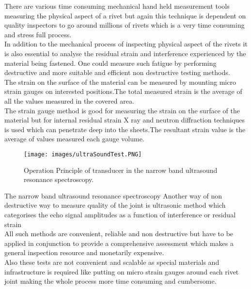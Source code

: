 \documentclass{article}
\begin{document}
    There are various time consuming mechanical hand held measurement tools measuring the physical aspect of a rivet but again this technique is dependent on quality inspectors to go around millions of rivets which is a very time consuming and stress full process.
    \\
    
    In addition to the mechanical process of inspecting physical aspect of the rivets it is also essential to analyse the residual strain and interference experienced by the material being fastened.\cite{inbook} One could measure such fatigue by performing destructive and more suitable and efficient non destructive testing methods.\\
    
    

    
    The strain on the surface of the material can be measured by mounting micro strain gauges on interested positions.The total measured strain is the average of all the values measured in the covered area.\\
    
    The strain gauge method is good for measuring the strain on the surface of the material but for internal residual strain X ray and neutron diffraction  techniques is used which can penetrate deep into the sheets.The resultant strain value is the average of values measured each gauge volume.\\
    
    \begin{figure}[htp]
    \centering
    \texttt{[image: images/ultraSoundTest.PNG]}
    \caption{ Operation Principle of transducer in the narrow band ultrasound resonance spectroscopy.  \cite{ultraSoundTest}}
    \label{fig: UltrasoundTest}
\end{figure}
    
    
    The narrow band ultrasound resonance spectroscopy 
    Another way of non destructive way to measure quality of the joint is ultrasonic  method which categorises the echo signal amplitudes as a function of interference or residual strain \cite{osti_191779} \\

    All such methods are convenient, reliable  and non destructive but have to be applied in conjunction to provide a comprehensive assessment which makes a general inspection resource and monetarily expensive. \\ 
    Also these tests are not convenient and scalable as special materials and infrastructure is required like putting on micro strain gauges around each rivet joint making the whole process more time consuming and cumbersome.
  
\end{document}
